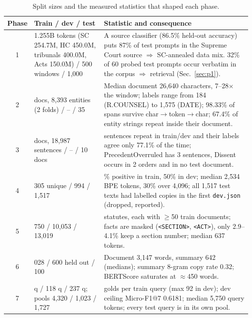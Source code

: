 \documentclass[11pt, oneside]{article}
\begin{document}
\begin{table}[t]
\centering
\scriptsize
\caption{Split sizes and the measured statistics that shaped each phase.}
\label{tab:data}
\begin{tabular}{@{}c>{\raggedright\arraybackslash}p{3.3cm}>{\raggedright\arraybackslash}p{9.6cm}@{}}
\toprule
Phase & Train / dev / test & Statistic and consequence \\
\midrule
1 & 1.255B tokens (SC 254.7M, HC 450.0M, tribunals 400.0M, Acts 150.0M) / 500 windows / 1{,}000 & A source classifier (86.5\% held-out accuracy) puts 87\% of test prompts in the Supreme Court source $\Rightarrow$ SC-annealed data mix. 32\% of 60 probed test prompts occur verbatim in the corpus $\Rightarrow$ retrieval (Sec.~\ref{sec:p1}). \\
2 & 70 docs, 8{,}393 entities (2 folds) / -- / 35 & Median document 26{,}640 characters, 7--28$\times$ the window; labels range from 184 (R.COUNSEL) to 1{,}575 (DATE); 98.33\% of spans survive char$\to$token$\to$char; 67.4\% of entity strings repeat inside their document. \\
3 & 90 docs, 18{,}987 sentences / -- / 10 docs & 496 sentences repeat in train/dev and their labels agree only 77.1\% of the time; PrecedentOverruled has 3 sentences, Dissent occurs in 2 orders and in no test document. \\
4 & 32{,}305 unique / 994 / 1{,}517 & 41\% positive in train, 50\% in dev; median 2{,}534 BPE tokens, 30\% over 4{,}096; all 1{,}517 test texts had labelled copies in the first \texttt{dev.json} (dropped, reported). \\
5 & 42{,}750 / 10{,}053 / 13{,}019 & 100 statutes, each with $\geq$50 train documents; facts are masked (\texttt{<SECTION>}, \texttt{<ACT>}), only 2.9--4.1\% keep a section number; median 637 tokens. \\
6 & 7{,}028 / 600 held out / 100 & Document 3{,}147 words, summary 642 (medians); summary 8-gram copy rate 0.32; BERTScore saturates at $\approx$450 words. \\
7 & 827 q / 118 q / 237 q; pools 4{,}320 / 1{,}023 / 1{,}727 & 6.42 golds per train query (max 92 in dev); dev ceiling Micro-F1@7 0.6181; median 5{,}750 query tokens; every test query is in its own pool. \\
\bottomrule
\end{tabular}
\end{table}
\end{document}
